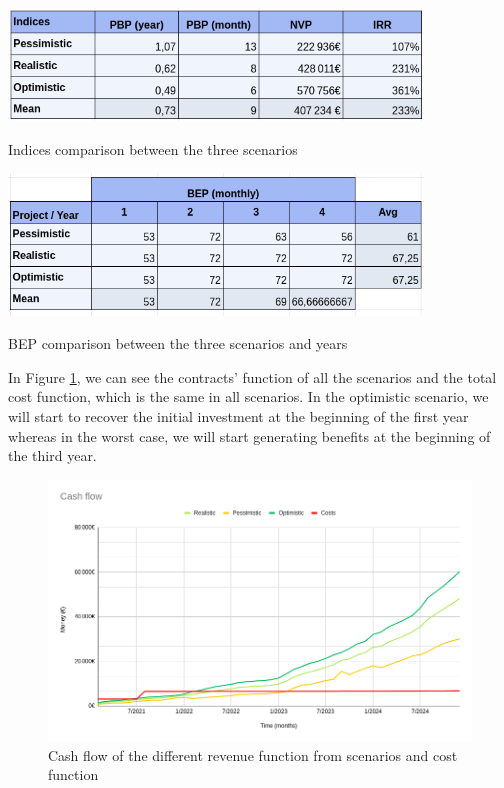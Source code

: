 \documentclass[./main.tex]{subfiles}
\begin{document}
\begin{table}[H]
	\centering
	\includegraphics[width=11cm]{img/indices2.png}
	\caption{Indices comparison between the three scenarios}
	\label{tab:indicies}
\end{table}
\begin{table}[H]
	\centering
	\includegraphics[width=11cm]{img/bep-year2.png}
	\caption{BEP comparison between the three scenarios and years}
	\label{tab:bep}
\end{table}

In Figure \ref{fig:cashflow}, we can see the contracts’ function of all the scenarios and the total cost function, which is the same in all scenarios. In the optimistic scenario, we will start to recover the initial investment at the beginning of the first year whereas in the worst case, we will start generating benefits at the beginning of the third year.
\begin{figure}[h]
	\centering
	\includegraphics[width=15cm]{img/CashFlow.png}
	\caption{Cash flow of the different revenue function from scenarios and cost function}
	\label{fig:cashflow}
\end{figure}
\end{document}
